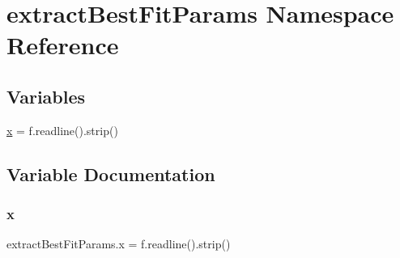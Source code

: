 \hypertarget{namespaceextractBestFitParams}{}\section{extract\+Best\+Fit\+Params Namespace Reference}
\label{namespaceextractBestFitParams}
\subsection*{Variables}
\begin{DoxyCompactItemize}
\item 
\mbox{\hyperlink{namespaceextractBestFitParams_a42ebf31d4eaeece6efd8c09f0467a883}{x}} = f.\+readline().strip()
\end{DoxyCompactItemize}


\subsection{Variable Documentation}
\mbox{\label{namespaceextractBestFitParams_a42ebf31d4eaeece6efd8c09f0467a883}} 
\subsubsection{\texorpdfstring{x}{x}}
{\footnotesize\ttfamily extract\+Best\+Fit\+Params.\+x = f.\+readline().strip()}

